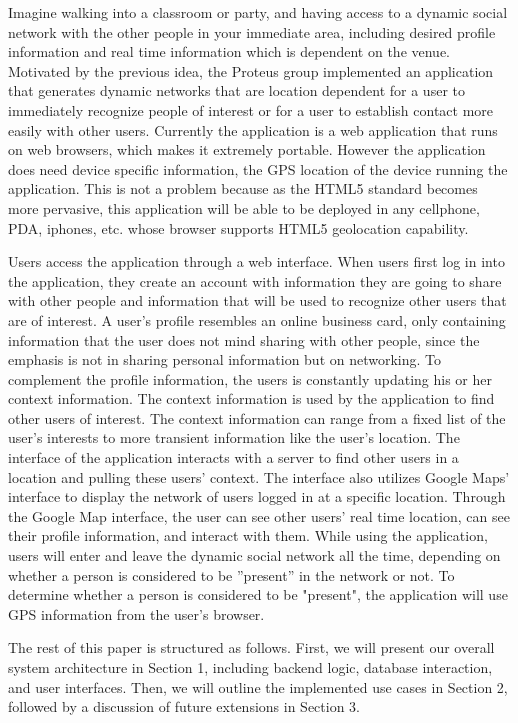 \documentclass[11pt]{article}
\begin{document}
{\color{red} 
Imagine walking into a classroom or party, and having access to a dynamic social network with the other people in your immediate area, including desired profile information and real time information which is dependent on the venue. Motivated by the previous idea, the Proteus group implemented an application that generates dynamic networks that are location dependent for a user to immediately recognize people of interest or for a user to establish contact more easily with other users. Currently the application is a web application that runs on web browsers, which makes it extremely portable. However the application does need device specific information, the GPS location of the device running the application. This is not a problem because as the HTML5 standard becomes more pervasive, this application will be able to be deployed in any cellphone, PDA, iphones, etc. whose browser supports HTML5 geolocation capability.


Users access the application through a web interface. When users first log in into the application, they create an account with information they are going to share with other people and information that will be used to recognize other users that are of interest. A user's profile resembles an online business card, only containing information that the user does not mind sharing with other people, since the emphasis is not in sharing personal information but on networking.   To complement the profile information, the users is constantly updating his or her context information. The context information is used by the application to find other users of interest. The context information can range from a fixed list of the user's interests to more transient information like the user's location. The interface of the application interacts with a server to find other users in a location and pulling these users' context. The interface also utilizes Google Maps' interface to display the network of users logged in at a specific location. Through the Google Map interface, the user can see other users' real time location, can see their profile information, and interact with them. While using the application, users will enter and leave the dynamic social network all the time, depending on whether a person is considered to be ''present'' in the network or not. To determine whether a person is considered to be "present", the application will use GPS information from the user's browser.
}

The rest of this paper is structured as follows. First, we will present our overall system architecture in Section 1, including backend logic, database interaction, and user interfaces. Then, we will outline the implemented use cases in Section 2, followed by a discussion of future extensions in Section 3.
\end{document}
